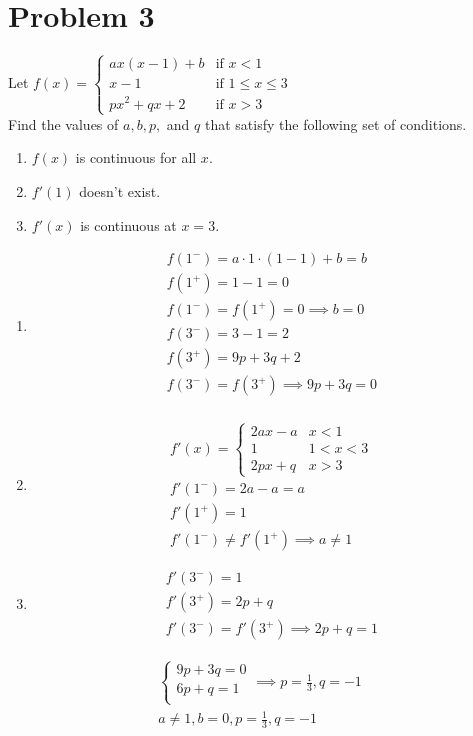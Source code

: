 \documentclass[12pt]{article}
\newcommand{\vem}{\vspace{0.5em}}
\newcommand{\problem}[1]{\section{Problem #1}}
\begin{document}
\problem{3}
Let $f(x)=\begin{cases}
    ax(x-1)+b & \text{if }x<1\\
    x-1 &\text{if }1\le x \le 3\\
    px^2+qx+2 &\text{if }x>3
\end{cases}$ \vem \\
Find the values of $a,b,p,$ and $q$ that satisfy the following set of conditions.
\begin{enumerate}
    \item $f(x)$ is continuous for all $x$.
    \item $f'(1)$ doesn't exist.
    \item $f'(x)$ is continuous at $x=3$.
\end{enumerate}
\begin{enumerate}
    \item \begin{gather*}
    f(1^-)=a\cdot1\cdot(1-1)+b=b\\
    f(1^+)=1-1=0\\
    f(1^-)=f(1^+)=0 \implies b=0\\
    f(3^-)=3-1=2\\
    f(3^+)=9p+3q+2\\
    f(3^-)=f(3^+) \implies 9p+3q=0\\
\end{gather*}
    \item \begin{gather*}
        f'(x)=\begin{cases}
        2ax-a &x<1\\
        1 & 1 < x < 3\\
        2px+q &x>3
    \end{cases}\\
    f'(1^-)=2a-a=a\\
    f'(1^+)=1\\
    f'(1^-)\ne f'(1^+) \implies a\ne 1
    \end{gather*}
    \item \begin{gather*}
        f'(3^-)=1\\
        f'(3^+)=2p+q\\
        f'(3^-)=f'(3^+)\implies 2p+q=1
    \end{gather*}
\end{enumerate}
\begin{gather*}
    \begin{cases}
        9p+3q=0 \\
        6p+q=1\\
    \end{cases} \implies p=\frac{1}{3}, q=-1\\
    \boxed{a\ne 1,b=0,p=\frac{1}{3}, q=-1}
\end{gather*}
\end{document}
